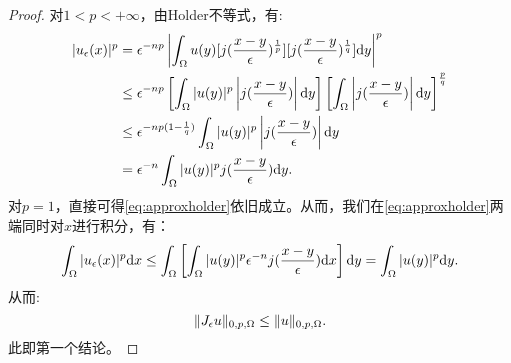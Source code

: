 \begin{proof}
    对$1<p<+\infty$，由Holder不等式，有:
    \begin{equation}
        \label{eq:approxholder}
        \begin{aligned}
            |u_{\epsilon}(x)|^{p}&=\epsilon^{-np}\left|\int_{\Omega}u(y)[j(\frac{x-y}{\epsilon})^{\frac{1}{p}}][j(\frac{x-y}{\epsilon})^{\frac{1}{q}}]\mathrm{d} y\right|^{p}\\
            &\le\epsilon^{-np}\left[\int_{\Omega}|u(y)|^{p}\left|j(\frac{x-y}{\epsilon})\right|\mathrm{d} y\right]\left[\int_{\Omega}\left|j(\frac{x-y}{\epsilon})\right|\mathrm{d} y\right]^{\frac{p}{q}}\\
            &\le\epsilon^{-np(1-\frac{1}{q})}\int_{\Omega}|u(y)|^{p}\left|j(\frac{x-y}{\epsilon})\right|\mathrm{d} y\\
            &=\epsilon^{-n}\int_{\Omega}|u(y)|^{p}j(\frac{x-y}{\epsilon})\mathrm{d} y.
        \end{aligned}
    \end{equation}
    对$p=1$，直接可得\eqref{eq:approxholder}依旧成立。从而，我们在\eqref{eq:approxholder}两端同时对$x$进行积分，有：
    \begin{equation}
        \int_{\Omega}|u_{\epsilon}(x)|^{p}\mathrm{d} x\le\int_{\Omega}\left[\int_{\Omega}|u(y)|^{p}\epsilon^{-n}j(\frac{x-y}{\epsilon})\mathrm{d} x\right]\mathrm{d} y=\int_{\Omega}|u(y)|^{p}\mathrm{d} y.
    \end{equation}
    从而:
    \begin{equation}
        \|J_{\epsilon}u\|_{0,p,\Omega}\le\|u\|_{0,p,\Omega}.
    \end{equation}
    此即第一个结论。


\end{proof}
